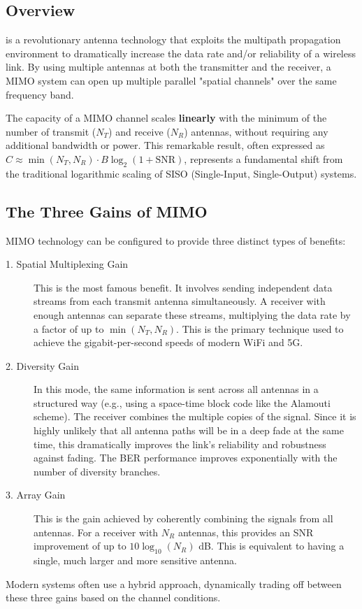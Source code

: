 \subsection{Overview}

 is a revolutionary antenna technology that exploits the multipath propagation environment to dramatically increase the data rate and/or reliability of a wireless link. By using multiple antennas at both the transmitter and the receiver, a MIMO system can open up multiple parallel "spatial channels" over the same frequency band.

\begin{keyconcept}
    The capacity of a MIMO channel scales \textbf{linearly} with the minimum of the number of transmit ($N_T$) and receive ($N_R$) antennas, without requiring any additional bandwidth or power. This remarkable result, often expressed as $C \approx \min(N_T, N_R) \cdot B \log_2(1 + \text{SNR})$, represents a fundamental shift from the traditional logarithmic scaling of SISO (Single-Input, Single-Output) systems.
\end{keyconcept}


\subsection{The Three Gains of MIMO}

MIMO technology can be configured to provide three distinct types of benefits:

\begin{description}
    \item[1. Spatial Multiplexing Gain] This is the most famous benefit. It involves sending independent data streams from each transmit antenna simultaneously. A receiver with enough antennas can separate these streams, multiplying the data rate by a factor of up to $\min(N_T, N_R)$. This is the primary technique used to achieve the gigabit-per-second speeds of modern WiFi and 5G.
    
    \item[2. Diversity Gain] In this mode, the same information is sent across all antennas in a structured way (e.g., using a space-time block code like the Alamouti scheme). The receiver combines the multiple copies of the signal. Since it is highly unlikely that all antenna paths will be in a deep fade at the same time, this dramatically improves the link's reliability and robustness against fading. The BER performance improves exponentially with the number of diversity branches.
    
    \item[3. Array Gain] This is the gain achieved by coherently combining the signals from all antennas. For a receiver with $N_R$ antennas, this provides an SNR improvement of up to $10\log_{10}(N_R)$ dB. This is equivalent to having a single, much larger and more sensitive antenna.
\end{description}
Modern systems often use a hybrid approach, dynamically trading off between these three gains based on the channel conditions.


